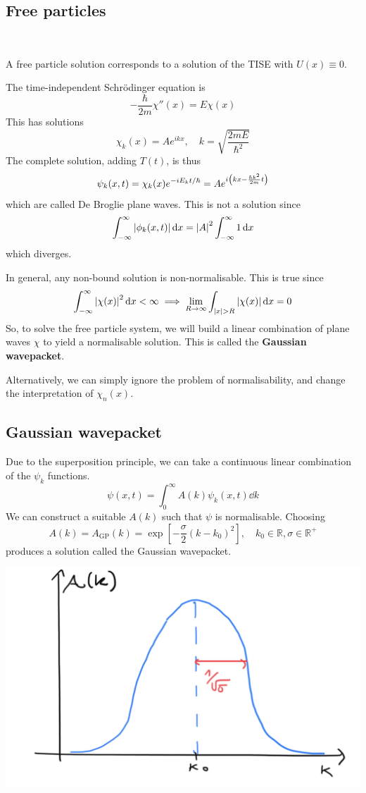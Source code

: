 \documentclass[a4paper,11pt]{article}
\begin{document}
\subsection{Free particles}\ \vspace{-1.5em}

\begin{definition}
    A free particle solution corresponds to a solution of the TISE with $U(x) \equiv 0$.
\end{definition}

The time-independent Schr\"odinger equation is
\[
	-\frac{\hbar}{2m} \chi''(x) = E\chi(x)
\]
This has solutions
\[
	\chi_k(x) = A e^{i k x},\quad k = \sqrt{\frac{2mE}{\hbar^2}}
\]
The complete solution, adding \( T(t) \), is thus
\[
	\psi_k(x,t) = \chi_k(x) e^{-i E_k t / \hbar} = A e^{i\qty(kx - \frac{\hbar k^2}{2m} t)}
\]
which are called De Broglie plane waves.
This is not a solution since
\[
	\int_{-\infty}^\infty \abs{\phi_k(x,t)} \dd{x} = \abs{A}^2 \int_{-\infty}^\infty 1 \dd{x}
\]
which diverges.

In general, any non-bound solution is non-normalisable.
This is true since \[
    \int_{-\infty}^\infty \abs{\chi(x)}^2 \dd{x} < \infty \implies \lim_{R \to \infty} \int_{\abs{x} > R} \abs{\chi(x)} \dd{x} = 0
\]
So, to solve the free particle system, we will build a linear combination of plane waves \( \chi \) to yield a normalisable solution.
This is called the \textbf{Gaussian wavepacket}.

Alternatively, we can simply ignore the problem of normalisability, and change the interpretation of \( \chi_n(x) \).

\subsection{Gaussian wavepacket}
Due to the superposition principle, we can take a continuous linear combination of the \( \psi_k \) functions.
\[
	\psi(x,t) = \int_0^\infty A(k) \psi_k(x,t) \dd{k}
\]
We can construct a suitable \( A(k) \) such that \( \psi \) is normalisable.
Choosing
\[
	A(k) = A_{\text{GP}}(k) = \exp[-\frac{\sigma}{2}(k-k_0)^2],\quad k_0 \in \mathbb R, \sigma \in \mathbb R^+
\]
produces a solution called the Gaussian wavepacket.

\begin{center}
    \includegraphics[scale=0.2]{qm8.png}
\end{center}
\end{document}
